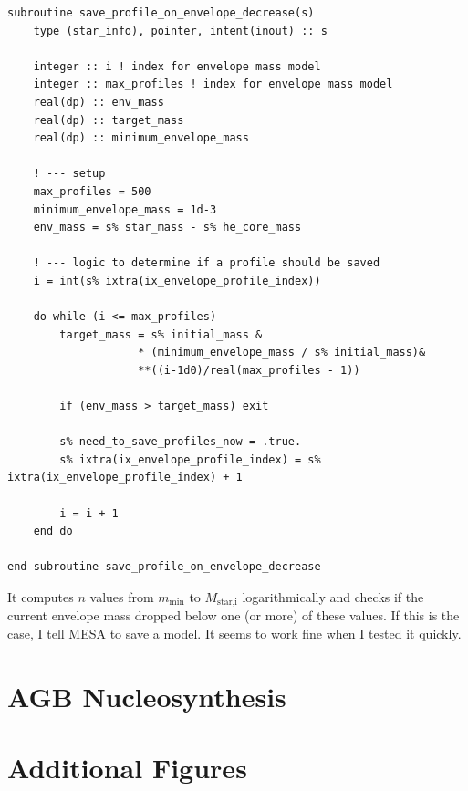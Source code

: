 \documentclass[a4paper,10pt]{article}
\begin{document}
\begin{verbatim}
subroutine save_profile_on_envelope_decrease(s)
    type (star_info), pointer, intent(inout) :: s

    integer :: i ! index for envelope mass model
    integer :: max_profiles ! index for envelope mass model
    real(dp) :: env_mass
    real(dp) :: target_mass
    real(dp) :: minimum_envelope_mass

    ! --- setup
    max_profiles = 500
    minimum_envelope_mass = 1d-3
    env_mass = s% star_mass - s% he_core_mass

    ! --- logic to determine if a profile should be saved
    i = int(s% ixtra(ix_envelope_profile_index))

    do while (i <= max_profiles)
        target_mass = s% initial_mass &
                    * (minimum_envelope_mass / s% initial_mass)&
                    **((i-1d0)/real(max_profiles - 1))
        
        if (env_mass > target_mass) exit

        s% need_to_save_profiles_now = .true.
        s% ixtra(ix_envelope_profile_index) = s% ixtra(ix_envelope_profile_index) + 1

        i = i + 1
    end do

end subroutine save_profile_on_envelope_decrease

\end{verbatim}

It computes \(n\) values from \(m_\text{min}\) to \(M_\text{star,i}\) logarithmically and checks if the current envelope mass dropped below one (or more) of these values. If this is the case, I tell MESA to save a model. It seems to work fine when I tested it quickly.

\section{AGB Nucleosynthesis}


\appendix
\section{Additional Figures}
\begin{figure}[ht]
    \centering
\end{figure}
\end{document}
